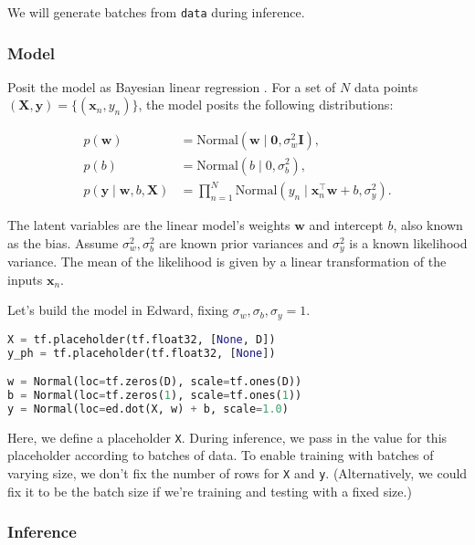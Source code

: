 We will generate batches from \texttt{data} during inference.

\subsubsection{Model}

Posit the model as Bayesian linear regression \citep{murphy2012machine}.
For a set of $N$ data points $(\mathbf{X},\mathbf{y})=\{(\mathbf{x}_n, y_n)\}$,
the model posits the following distributions:

\begin{align*}
  p(\mathbf{w})
  &=
  \text{Normal}(\mathbf{w} \mid \mathbf{0}, \sigma_w^2\mathbf{I}),
  \\[1.5ex]
  p(b)
  &=
  \text{Normal}(b \mid 0, \sigma_b^2),
  \\
  p(\mathbf{y} \mid \mathbf{w}, b, \mathbf{X})
  &=
  \prod_{n=1}^N
  \text{Normal}(y_n \mid \mathbf{x}_n^\top\mathbf{w} + b, \sigma_y^2).
\end{align*}

The latent variables are the linear model's weights $\mathbf{w}$ and
intercept $b$, also known as the bias.
Assume $\sigma_w^2,\sigma_b^2$ are known prior variances and $\sigma_y^2$ is a
known likelihood variance. The mean of the likelihood is given by a
linear transformation of the inputs $\mathbf{x}_n$.

Let's build the model in Edward, fixing $\sigma_w,\sigma_b,\sigma_y=1$.

\begin{lstlisting}[language=Python]
X = tf.placeholder(tf.float32, [None, D])
y_ph = tf.placeholder(tf.float32, [None])

w = Normal(loc=tf.zeros(D), scale=tf.ones(D))
b = Normal(loc=tf.zeros(1), scale=tf.ones(1))
y = Normal(loc=ed.dot(X, w) + b, scale=1.0)
\end{lstlisting}

Here, we define a placeholder \texttt{X}. During inference, we pass in
the value for this placeholder according to batches of data.
To enable training with batches of varying size,
we don't fix the number of rows for \texttt{X} and \texttt{y}. (Alternatively,
we could fix it to be the batch size if we're training and testing
with a fixed size.)

\subsubsection{Inference}

